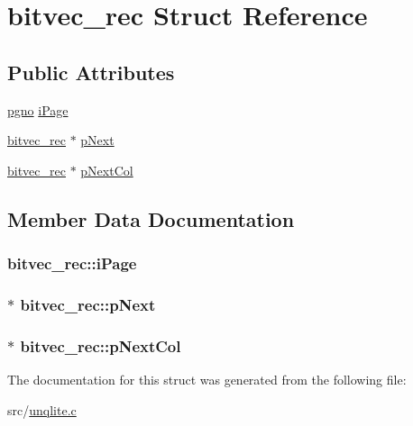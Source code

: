 \hypertarget{structbitvec__rec}{\section{bitvec\-\_\-rec Struct Reference}
\label{d0/dd6/structbitvec__rec}
}
\subsection*{Public Attributes}
\begin{DoxyCompactItemize}
\item 
\hyperlink{unqlite_8c_a90bf132c9229151f7c29e84e592907cd}{pgno} \hyperlink{structbitvec__rec_a947a16e77b1ed4083d48d1fbe84768b4}{i\-Page}
\item 
\hyperlink{structbitvec__rec}{bitvec\-\_\-rec} $\ast$ \hyperlink{structbitvec__rec_ac215b2825c074f6c520e3afa150aee66}{p\-Next}
\item 
\hyperlink{structbitvec__rec}{bitvec\-\_\-rec} $\ast$ \hyperlink{structbitvec__rec_aad51932679790c6a846e26d1668469e9}{p\-Next\-Col}
\end{DoxyCompactItemize}


\subsection{Member Data Documentation}
\hypertarget{structbitvec__rec_a947a16e77b1ed4083d48d1fbe84768b4}{
\subsubsection[{i\-Page}]{ bitvec\-\_\-rec\-::i\-Page}}\label{d0/dd6/structbitvec__rec_a947a16e77b1ed4083d48d1fbe84768b4}
\hypertarget{structbitvec__rec_ac215b2825c074f6c520e3afa150aee66}{
\subsubsection[{p\-Next}]{$\ast$ bitvec\-\_\-rec\-::p\-Next}}\label{d0/dd6/structbitvec__rec_ac215b2825c074f6c520e3afa150aee66}
\hypertarget{structbitvec__rec_aad51932679790c6a846e26d1668469e9}{
\subsubsection[{p\-Next\-Col}]{ $\ast$ bitvec\-\_\-rec\-::p\-Next\-Col}}\label{d0/dd6/structbitvec__rec_aad51932679790c6a846e26d1668469e9}


The documentation for this struct was generated from the following file\-:\begin{DoxyCompactItemize}
\item 
src/\hyperlink{unqlite_8c}{unqlite.\-c}\end{DoxyCompactItemize}
